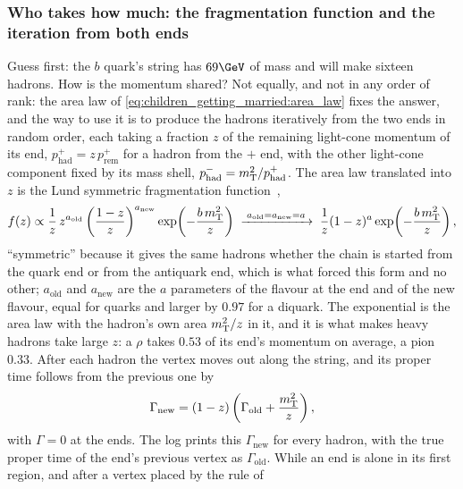 \subsubsection{Who takes how much: the fragmentation function and the iteration from both ends}
\label{sec:children_getting_married:fragmentation_function}

Guess first: the $b$ quark's string has $69\GeV$ of mass and will make
sixteen hadrons. How is the momentum shared? Not equally, and not in any
order of rank: the area law of \cref{eq:children_getting_married:area_law}
fixes the answer, and the way to use it is to produce the hadrons
iteratively from the two ends in random order, each taking a fraction $z$
of the remaining light-cone momentum of its end,
$p^+_{\mathrm{had}}=z\,p^+_{\mathrm{rem}}$ for a hadron from the $+$ end,
with the other light-cone component fixed by its mass shell,
$p^-_{\mathrm{had}}=m_{\mathrm{T}}^2/p^+_{\mathrm{had}}$. The area law translated
into $z$ is the Lund symmetric fragmentation
function~\cite{Andersson:1983jt},
\begin{equation}
  f(z)\propto\frac{1}{z}\,z^{a_{\mathrm{old}}}\left(\frac{1-z}{z}\right)^{a_{\mathrm{new}}}
  \exp\!\left(-\frac{b\,m_{\mathrm{T}}^2}{z}\right)
  \;\xrightarrow{\;a_{\mathrm{old}}=a_{\mathrm{new}}=a\;}\;
  \frac{1}{z}(1-z)^a\exp\!\left(-\frac{b\,m_{\mathrm{T}}^2}{z}\right),
  \label{eq:children_getting_married:lund}
\end{equation}
``symmetric'' because it gives the same hadrons whether the chain is
started from the quark end or from the antiquark end, which is what forced
this form and no other; $a_{\mathrm{old}}$ and $a_{\mathrm{new}}$ are the
$a$ parameters of the flavour at the end and of the new flavour, equal for
quarks and larger by $0.97$ for a diquark. The exponential is the area law
with the hadron's own area $m_{\mathrm{T}}^2/z$ in it, and it is what makes heavy
hadrons take large $z$: a $\rho$ takes $0.53$ of its end's momentum on
average, a pion $0.33$. After each hadron the vertex moves out along the
string, and its proper time follows from the previous one by
\begin{equation}
  \Gamma_{\mathrm{new}}=(1-z)\left(\Gamma_{\mathrm{old}}+\frac{m_{\mathrm{T}}^2}{z}\right),
  \label{eq:children_getting_married:gamma_step}
\end{equation}
with $\Gamma=0$ at the ends. The log prints this $\Gamma_{\mathrm{new}}$
for every hadron, with the true proper time of the end's previous vertex
as $\Gamma_{\mathrm{old}}$. While an end is alone in its first region, and
after a vertex placed by the rule of
